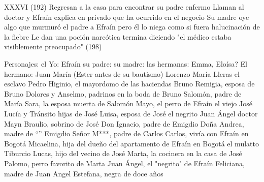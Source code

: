 XXXVI (192)
Regresan a la casa para encontrar su padre enfermo
Llaman al doctor y Efraín explica en privado que ha ocurrido en el negocio
Su madre oye algo que murmuró el padre a Efraín pero él lo niega como si fuera halucinación de la fiebre
Le dan una poción narcótica 
termina diciendo "el médico estaba visiblemente preocupado" (198)



Personajes:
el Yo: Efraín
su padre:
su madre:
las hermanas: Emma, Eloísa?
El hermano: Juan
María (Ester antes de su bautismo)
Lorenzo María Lleras
el esclavo Pedro
Higinio, el mayordomo de las haciendas
Bruno
Remigia, esposa de Bruno
Dolores y Anselmo, padrinos en la boda de Bruno
Salomón, padre de María
Sara, la esposa muerta de Salomón
Mayo, el perro de Efraín
el viejo José
Lucía y Tránsito hijas de José
Luisa, esposa de José
el negrito Juan Ángel
doctor Mayn
Braulio, sobrino de José
Don Ignacio, padre de Emigdio
Doña Andrea, madre de  “”
Emigdio
Señor M***, padre de Carlos
Carlos, vivía con Efraín en Bogotá
Micaelina, hija del dueño del apartamento de Efraín en Bogotá
el mulatto Tiburcio
Lucas, hijo del vecino de José
Marta, la  cocinera en la casa de José
Palomo, perro favorito de Marta
Juan Ángel, el "negrito" de Efraín
Feliciana, madre de Juan Angel
Estefana, negra de doce años 
